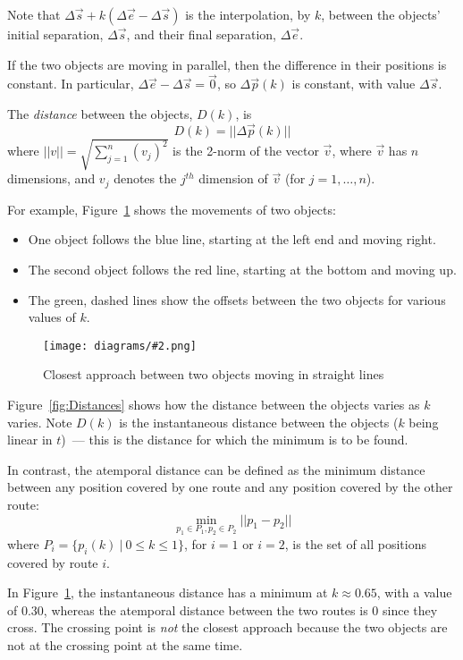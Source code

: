 \documentclass[times,12pt]{article}
\newcommand{\figh}[3][0.4]{
	\begin{figure}[tbp]
		\begin{center}
			\texttt{[image: diagrams/\#2.png]}%
		\end{center}
		\caption{#3}
		\label{fig:#2}
	\end{figure}
}
\begin{document}
Note that $\Delta{\vec{s}} + k(\Delta{\vec{e}} - \Delta{\vec{s}})$ is the
interpolation, by $k$, between the objects' initial separation,
$\Delta{\vec{s}}$, and their final separation, $\Delta{\vec{e}}$.

If the two objects are moving in parallel, then the difference in their positions is constant. In particular, $\Delta{\vec{e}} - \Delta{\vec{s}} = \vec{0}$, so $\Delta{\vec{p}}(k)$ is constant, with value $\Delta{\vec{s}}$.

The \emph{distance} between the objects, $D(k)$, is
\begin{equation}
\label{eqn:distance}
	D(k) = ||\Delta{\vec{p}}(k)||
\end{equation}
where $||v|| = \sqrt{\sum_{j=1}^n (v_j)^2}$ is the 2-norm of the vector $\vec{v}$, where $\vec{v}$ has $n$ dimensions, and $v_j$ denotes the $j^{th}$ dimension of $\vec{v}$ (for $j=1, \dots, n$).

For example, Figure~\ref{fig:PositionsForK} shows the movements of two objects:
\begin{itemize}
	\item One object follows the blue line, starting at the left end and moving right.
	\item The second object follows the red line, starting at the bottom and moving up.
	\item The green, dashed lines show the offsets between the two objects for various values of $k$.
\end{itemize}

\figh[0.4]{PositionsForK}{Closest approach between two objects moving in straight lines}

Figure~\ref{fig:Distances} shows how the distance between the objects varies as $k$ varies. Note $D(k)$ is the instantaneous distance between the objects ($k$ being linear in $t$)~--- this is the distance for which the minimum is to be found.

In contrast, the atemporal distance can be defined as the minimum distance between any position covered by one route and any position covered by the other route:
\[
\min_{p_1 \in P_1, p_2 \in P_2} ||p_1 - p_2||
\]
where $P_i = \{ p_i(k) \ | \ 0 \le k \le 1 \}$, for $i=1$ or $i=2$, is the set of all positions covered by route $i$.

In Figure~\ref{fig:PositionsForK}, the instantaneous distance has a minimum at $k \approx 0.65$, with a value of 0.30, whereas the atemporal distance between the two routes is 0 since they cross. The crossing point is \emph{not} the closest approach because the two objects are not at the crossing point at the same time.
\end{document}
